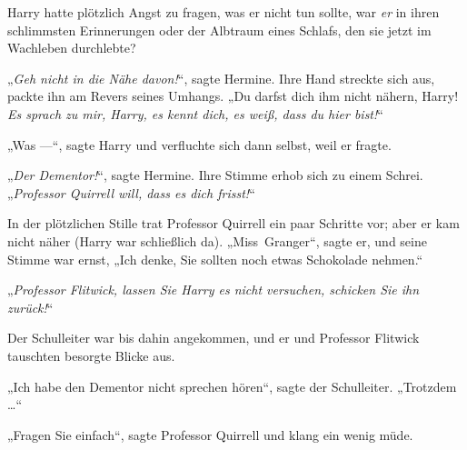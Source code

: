 Harry hatte plötzlich Angst zu fragen, was er nicht tun sollte, war \emph{er} in ihren schlimmsten Erinnerungen oder der Albtraum eines Schlafs, den sie jetzt im Wachleben durchlebte?

„\emph{Geh nicht in die Nähe davon!}“, sagte Hermine. Ihre Hand streckte sich aus, packte ihn am Revers seines Umhangs.
„Du darfst dich ihm nicht nähern, Harry! \emph{Es sprach zu mir, Harry, es kennt dich, es weiß, dass du hier bist!}“

„Was —“, sagte Harry und verfluchte sich dann selbst, weil er fragte.

„\emph{Der Dementor!}“, sagte Hermine. Ihre Stimme erhob sich zu einem Schrei.
„\emph{Professor Quirrell will, dass es dich frisst!}“

In der plötzlichen Stille trat Professor Quirrell ein paar Schritte vor; aber er kam nicht näher (Harry war schließlich da).
„Miss~Granger“, sagte er, und seine Stimme war ernst,
„Ich denke, Sie sollten noch etwas Schokolade nehmen.“

„\emph{Professor Flitwick, lassen Sie Harry es nicht versuchen, schicken Sie ihn zurück!}“

Der Schulleiter war bis dahin angekommen, und er und Professor Flitwick tauschten besorgte Blicke aus.

„Ich habe den Dementor nicht sprechen hören“, sagte der Schulleiter.
„Trotzdem …“

„Fragen Sie einfach“, sagte Professor Quirrell und klang ein wenig müde.

